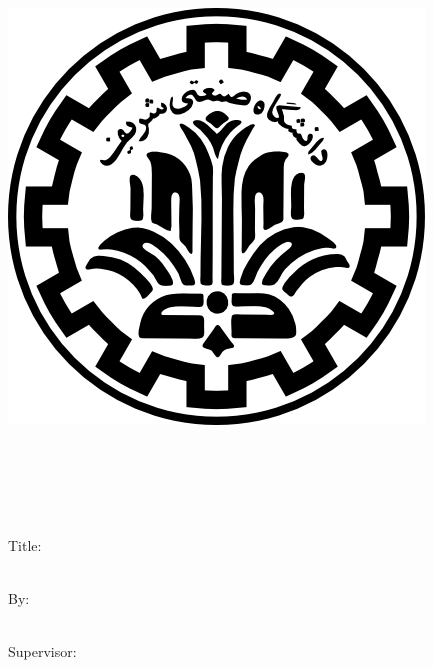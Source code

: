 
\pagestyle{empty}

\begin{center}

\begin{latin}

\vspace{0.2cm}

\includegraphics[scale=0.2]{./base/figures/logo.png}

\begin{Large}

\vspace{-0.2cm}
\MyUniversityEnglish\\
\vspace{-0.1cm}
\MyDepartmentEnglish\\
\vspace{0.5cm}
\MyThesisEnglish\\
\vspace{-0.1cm}
\MyMajorEnglish\\

\end{Large}

\vspace{1cm}

\large{Title:}\\
\vspace{0.2cm}
\textbf{\huge{\MyThesisTitleEnglish}}\\

\vspace{0.5cm}

\large{By:}\\
\Large{\textbf{\MyNameEnglish}}\\

\vspace{0.5cm}

\large{Supervisor:}\\ 
\vspace{0.0cm}
\Large{\textbf{\MyProfessorEnglish}}\\

\vspace{1cm}

\large{\MyPresentationDateEnglish}

\end{latin}

\end{center}

\newpage
